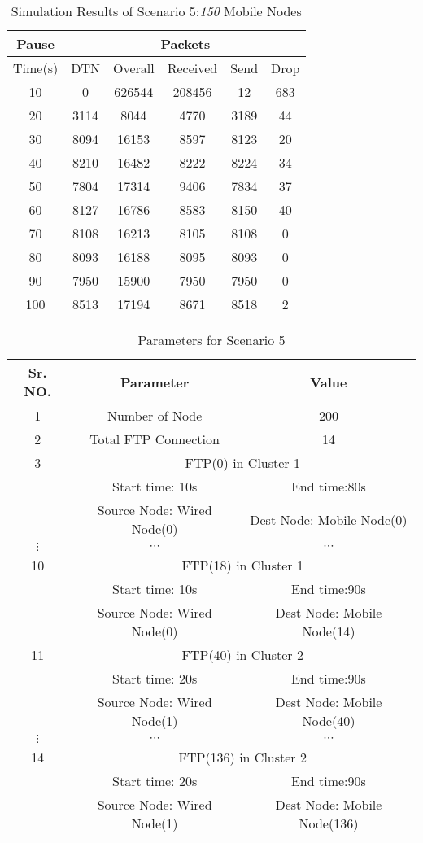 \documentclass[3p,times]{elsarticle}
\begin{document}
\begin{table}[t]
\caption{Simulation Results of Scenario 5:\emph{150} Mobile Nodes}
\label{t12}
\centering
\begin{tabular}{|c|c|c|c|c|c|}
\hline
Pause  & \multicolumn{5}{c|}{Packets} \\
\hline
Time(s) & DTN   & Overall & Received & Send & Drop \\
\hline
10 & 0 & 626544 & 208456 & 12 & 683\\
20 & 3114 & 8044 & 4770 & 3189 & 44\\
30 & 8094 & 16153 & 8597 & 8123 & 20\\
40 & 8210 & 16482 & 8222 & 8224 & 34\\
50 & 7804 & 17314 & 9406 & 7834 & 37\\
60 & 8127 & 16786 & 8583 & 8150 & 40\\
70 & 8108 & 16213 & 8105 & 8108 & 0\\
80 & 8093 & 16188 & 8095 & 8093 & 0\\
90 & 7950 & 15900 & 7950 & 7950 & 0\\
100 & 8513 & 17194 & 8671 & 8518 & 2\\
\hline
\end{tabular}
\end{table}

\begin{table}[t]
\centering
\caption{Parameters for Scenario 5}
\begin{tabular}{|c|c|c|}
\hline
Sr. NO. & Parameter & Value \\
\hline
1 & Number of Node & 200 \\
2& Total FTP Connection & 14 \\
\hline
3 & \multicolumn{2}{|c|}{ FTP(0) in Cluster 1} \\
 & Start time: 10s &  End time:80s\\
 & Source Node: Wired Node(0) & Dest Node: Mobile Node(0) \\
$ \vdots $ & $ \cdots $ & $ \cdots $ \\
\hline
10 & \multicolumn{2}{|c|}{ FTP(18) in Cluster 1} \\
 & Start time: 10s &  End time:90s\\
 & Source Node: Wired Node(0) & Dest Node: Mobile Node(14) \\
\hline
11 & \multicolumn{2}{|c|}{ FTP(40) in Cluster 2} \\
 & Start time: 20s &  End time:90s\\
 & Source Node: Wired Node(1) & Dest Node: Mobile Node(40) \\
\hline
$ \vdots $ & $ \cdots $ & $ \cdots $ \\
\hline
14 & \multicolumn{2}{|c|}{ FTP(136) in Cluster 2} \\
 & Start time: 20s &  End time:90s\\
 & Source Node: Wired Node(1) & Dest Node: Mobile Node(136) \\
\hline
\end{tabular}
\label{t11}
\end{table}
\end{document}
